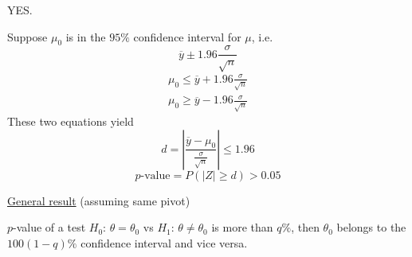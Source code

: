YES.

Suppose $ \mu_0 $ is in the $ 95\% $ confidence interval for $ \mu $, i.e.
\[ \overline{y}\pm 1.96 \frac{\sigma}{\sqrt{n}} \]
\[ \begin{aligned}
        \mu_0\leqslant \overline{y}+1.96 \frac{\sigma}{\sqrt{n}} \\
        \mu_0\geqslant \overline{y}-1.96 \frac{\sigma}{\sqrt{n}}
    \end{aligned}
\]
These two equations yield
\[ d=\left|\frac{\overline{y}-\mu_0}{\frac{\sigma}{\sqrt{n}}} \right|\leqslant 1.96 \]
\[ p\text{-value}=P(|Z|\geqslant d)>0.05 \]

\underline{General result} (assuming same pivot)

$ p $-value of a test $ H_0 $: $ \theta=\theta_0 $ vs $ H_1 $: $ \theta\neq \theta_0 $
is more than $ q\% $, then $ \theta_0 $ belongs to the $ 100(1-q)\% $
confidence interval and vice versa.

